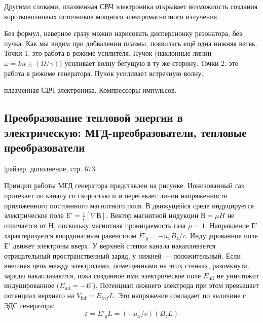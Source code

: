 \documentclass[10pt, a4paper]{article}
\begin{document}
Другими словами, плазменная СВЧ электроника открывает возможиость создания коротковолновых источников мощного электромагнитного излучения.


Без формул, наверное сразу можно нарисовать дисперсионку резонатора, без пучка.  Как мы видим при добвалении плазмы, появилась ещё одна нижняя ветвь. Точки 1. это работа в режиме усилителя. Пучок (наклонные линии $\omega=ku\pm (\Omega/\gamma)$) усиливает волну бегущую в ту же сторону. Точки 2. это работа в режиме генератора. Пучок усиливает встречную волну.



плазменная СВЧ электроника.
Компрессоры импульсов.


\subsection{Преобразование тепловой энергии в электрическую: МГД-преобразователи, тепловые преобразователи}
\label{14.5} 
[райзер, дополнение, стр. 673]

\begin{figure}[h!]
\end{figure}

Принцип работы МГД генератора представлен на рисунке. Ионизованный газ протекает по каналу со скоростью и и пересекает линии напряженности приложенного постоянного магнитного поля. В движущейся среде индуцируется электрическое поле $Е' =\frac{1}{c} [V\; В]$. Вектор магнитной индукции $В =\mu H$ не отличается от $Н$, поскольку магнитная проницаемость газа $\mu=1$. Направление Е' характеризуется  
координатным равенством $E’_y=-u_x B_z / c $. Индуцированное поле Е' движет электроны вверх. У верхней  
стенки канала накапливается отрицательный пространственный заряд, у нижней — положительный. Если внешняя цепь между электродами, помещенными на этих стенках, разомкнута, заряды накапливаются, пока созданное ими электрическое поле $E_{\inf}$ не уничтожит индуцированное ($E_{\inf}=-E’$). Потенциал нижнего электрода при этом превышает потенциал верхнего на $V_{\inf} = E_{inf} L$. Это напряжение совпадает по величине с ЭДС генератора:
\begin{equation}
	\varepsilon=E’_{y}L=(-u_x /c)(B_z L)
\end{equation}
\end{document}

